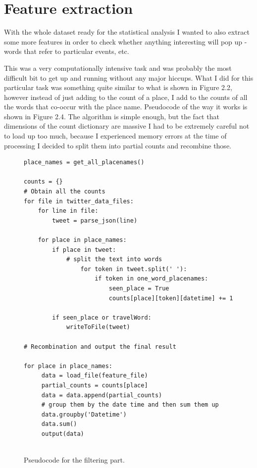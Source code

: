 \documentclass[minf,frontabs,twoside,singlespacing,parskip]{infthesis}
\begin{document}
\section{Feature extraction}


With the whole dataset ready for the statistical analysis I wanted to also extract some more features in order to check whether anything interesting will pop up - words that refer to particular events, etc. 


This was a very computationally intensive task and was probably the most difficult bit to get up and running without any major hiccups. What I did for this particular task was something quite similar to what is shown in Figure 2.2, however instead of just adding to the count of a place, I add to the counts of all the words that co-occur with the place name.  Pseudocode of the way it works is shown in Figure 2.4. The algorithm is simple enough, but the fact that dimensions of the count dictionary are massive I had to be extremely careful not to load up too much, because I experienced memory errors at the time of processing I decided to split them into partial counts and recombine those. 


\begin{figure}[]
\begin{center}
\begin{lstlisting}
place_names = get_all_placenames()

counts = {}
# Obtain all the counts
for file in twitter_data_files:
    for line in file:
        tweet = parse_json(line)
  
  	for place in place_names:
	    if place in tweet:
	        # split the text into words
                for token in tweet.split(' '): 
                    if token in one_word_placenames:
                        seen_place = True
                        counts[place][token][datetime] += 1

        if seen_place or travelWord:
            writeToFile(tweet)
            
# Recombination and output the final result

for place in place_names:
     data = load_file(feature_file)
     partial_counts = counts[place]
     data = data.append(partial_counts)
     # group them by the date time and then sum them up
     data.groupby('Datetime')
     data.sum()
     output(data)
    
\end{lstlisting}
\end{center}
\caption{Pseudocode for the filtering part. }
\end{figure}
\end{document}
